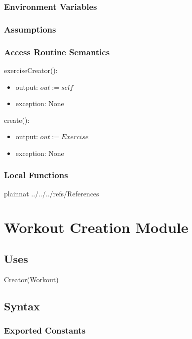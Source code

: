 \documentclass[12pt, titlepage]{article}
\begin{document}
\subsubsection{Environment Variables}

\subsubsection{Assumptions}

\subsubsection{Access Routine Semantics}

\noindent exerciseCreator():
\begin{itemize}
	\item output: $out := self$
	\item exception: None
\end{itemize}

\noindent create():
\begin{itemize}
	\item output: $out := Exercise$
	\item exception: None
\end{itemize}

\subsubsection{Local Functions}

\newpage

 {plainnat}
 {../../../refs/References}

\newpage

\section{Workout Creation Module}

\subsection{Uses}

Creator(Workout)

\subsection{Syntax}

\subsubsection{Exported Constants}
\end{document}
